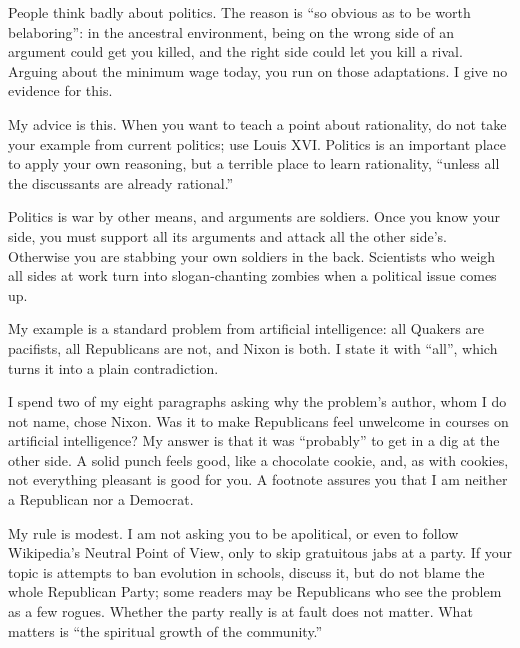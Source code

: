 
People think badly about politics. The reason is ``so obvious as to be worth belaboring'': in the ancestral environment, being on the wrong side of an argument could get you killed, and the right side could let you kill a rival. Arguing about the minimum wage today, you run on those adaptations. I give no evidence for this.

My advice is this. When you want to teach a point about rationality, do not take your example from current politics; use Louis XVI. Politics is an important place to apply your own reasoning, but a terrible place to learn rationality, ``unless all the discussants are already rational.'' 

Politics is war by other means, and arguments are soldiers. Once you know your side, you must support all its arguments and attack all the other side's. Otherwise you are stabbing your own soldiers in the back. Scientists who weigh all sides at work turn into slogan-chanting zombies when a political issue comes up.

My example is a standard problem from artificial intelligence: all Quakers are pacifists, all Republicans are not, and Nixon is both. I state it with ``all'', which turns it into a plain contradiction. 

I spend two of my eight paragraphs asking why the problem's author, whom I do not name, chose Nixon. Was it to make Republicans feel unwelcome in courses on artificial intelligence? My answer is that it was ``probably'' to get in a dig at the other side. A solid punch feels good, like a chocolate cookie, and, as with cookies, not everything pleasant is good for you.  A footnote assures you that I am neither a Republican nor a Democrat.

My rule is modest. I am not asking you to be apolitical, or even to follow Wikipedia's Neutral Point of View, only to skip gratuitous jabs at a party. If your topic is attempts to ban evolution in schools, discuss it, but do not blame the whole Republican Party; some readers may be Republicans who see the problem as a few rogues. Whether the party really is at fault does not matter. What matters is ``the spiritual growth of the community.'' 


